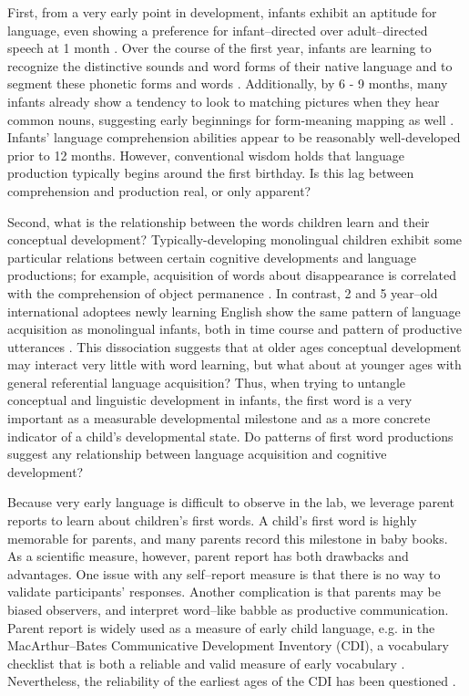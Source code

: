 \documentclass[10pt,letterpaper]{article}
\begin{document}
First, from a very early point in development, infants exhibit an aptitude for language, even showing a preference for infant--directed over adult--directed speech at 1 month \cite{cooper1990}. Over the course of the first year, infants are learning to recognize the distinctive sounds and word forms of their native language \cite{kuhl2004} and to segment these phonetic forms and words \cite{werker2005}. Additionally, by 6 - 9 months, many infants already show a tendency to look to matching pictures when they hear common nouns, suggesting early beginnings for form-meaning mapping as well \cite{bergelson2012}. Infants' language comprehension abilities appear to be reasonably well-developed prior to 12 months. However, conventional wisdom holds that language production typically begins around the first birthday. Is this lag between comprehension and production real, or only apparent?

Second, what is the relationship between the words children learn and their conceptual development? Typically-developing monolingual children exhibit some particular relations between certain cognitive developments and language productions; for example, acquisition of words about disappearance is correlated with the comprehension of object permanence \cite{gopnik1986}. In contrast, 2 and 5 year--old international adoptees newly learning English show the same pattern of language acquisition as monolingual infants, both in time course and pattern of productive utterances \cite{snedeker2007}. This dissociation suggests that at older ages conceptual development may interact very little with word learning, but what about at younger ages with general referential language acquisition? Thus, when trying to untangle conceptual and linguistic development in infants, the first word is a very important as a measurable developmental milestone and as a more concrete indicator of a child's developmental state. Do patterns of first word productions suggest any relationship between language acquisition and cognitive development? 

Because very early language is difficult to observe in the lab, we leverage parent reports to learn about children's first words. A child's first word is highly memorable for parents, and many parents record this milestone in baby books. As a scientific measure, however, parent report has both drawbacks and advantages. One issue with any self--report measure is that there is no way to validate participants' responses. Another complication is that parents may be biased observers, and interpret word--like babble as productive communication. Parent report is widely used as a measure of early child language, e.g. in the MacArthur--Bates Communicative Development Inventory (CDI), a vocabulary checklist that is both a reliable and valid measure of early vocabulary \cite{fenson1994,fenson2007}. Nevertheless, the reliability of the earliest ages of the CDI has been questioned \cite{feldman2000}.
\end{document}
